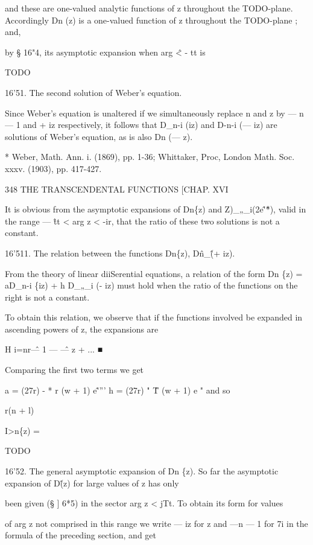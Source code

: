 and these are one-valued analytic functions of z throughout the
TODO-plane. Accordingly Dn (z) is a one-valued function of z
throughout the TODO-plane ; and,

by § 16"4, its asymptotic expansion when arg \^ < - tt is

TODO

16'51. The second solution of Weber's equation.

Since Weber's equation is unaltered if we simultaneously replace n and
z by — n — 1 and + iz respectively, it follows that D\_n-i (iz) and
D-n-i (— iz) are solutions of Weber's equation, as is also Dn (— z).

* Weber, Math. Ann. i. (1869), pp. 1-36; Whittaker, Proc, London Math.
Soc. xxxv. (1903), pp. 417-427.



348 THE TRANSCENDENTAL FUNCTIONS [CHAP. XVI

It is obvious from the asymptotic expansions of Dn\{z) and
Z)\_„\_i(2e\^'\^*), valid in the range — \^ tt < arg z < -ir, that the
ratio of these two solutions is not a constant.

16'511. The relation between the functions Dn\{z), D\^n\_\^ (+ iz).

From the theory of linear diiSerential equations, a relation of the
form Dn \{z) = aD\_n-i \{iz) + h D\_„\_i (- iz) must hold when the
ratio of the functions on the right is not a constant.

To obtain this relation, we observe that if the functions involved be
expanded in ascending powers of z, the expansions are

H i=nr\^ — 1 — \^ — z + ... ■



Comparing the first two terms we get

a = (27r) - * r (w + 1) e\^'''' h = (27r) " \^ T (w + 1) e " and so

r(n + l)



I>n\{z) =



TODO

16'52. The general asymptotic expansion of Dn \{z). So far the
asymptotic expansion of D\^ (z) for large values of z has only

been given (§ ] 6*5) in the sector arg z < jTt. To obtain its form for
values

of arg z not comprised in this range we write — iz for z and —n — 1
for 7i in the formula of the preceding section, and get

